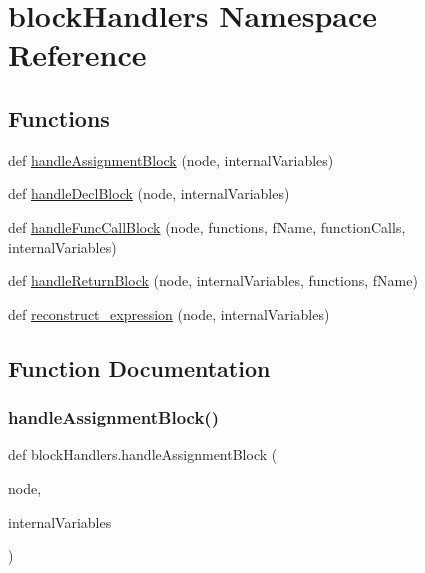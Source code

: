 \hypertarget{namespaceblockHandlers}{}\section{block\+Handlers Namespace Reference}
\label{namespaceblockHandlers}
\subsection*{Functions}
\begin{DoxyCompactItemize}
\item 
def \hyperlink{namespaceblockHandlers_ac54cbd08eb8b12eed0c801fa775911dd}{handle\+Assignment\+Block} (node, internal\+Variables)
\item 
def \hyperlink{namespaceblockHandlers_ad92852be9f2eee24eb76b2dd747e7584}{handle\+Decl\+Block} (node, internal\+Variables)
\item 
def \hyperlink{namespaceblockHandlers_ac034bd474478ead202ae756242b4348c}{handle\+Func\+Call\+Block} (node, functions, f\+Name, function\+Calls, internal\+Variables)
\item 
def \hyperlink{namespaceblockHandlers_a9a619208834c3d0aa0861354376f5208}{handle\+Return\+Block} (node, internal\+Variables, functions, f\+Name)
\item 
def \hyperlink{namespaceblockHandlers_a5dcb5985c58176982a44686f616daa7f}{reconstruct\+\_\+expression} (node, internal\+Variables)
\end{DoxyCompactItemize}


\subsection{Function Documentation}
\mbox{\label{namespaceblockHandlers_ac54cbd08eb8b12eed0c801fa775911dd}} 
\subsubsection{\texorpdfstring{handle\+Assignment\+Block()}{handleAssignmentBlock()}}
{\footnotesize\ttfamily def block\+Handlers.\+handle\+Assignment\+Block (\begin{DoxyParamCaption}\item[{}]{node,  }\item[{}]{internal\+Variables }\end{DoxyParamCaption})}

